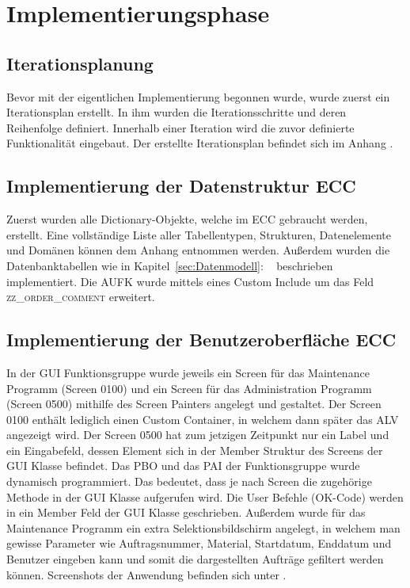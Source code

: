 \section{Implementierungsphase} 
\label{sec:Implementierungsphase}

\subsection{Iterationsplanung}
\label{sec:Iterationsplanung}
Bevor mit der eigentlichen Implementierung begonnen wurde, wurde zuerst ein Iterationsplan erstellt. In ihm wurden die Iterationsschritte und deren Reihenfolge definiert. Innerhalb einer Iteration wird die zuvor definierte Funktionalität eingebaut. Der erstellte Iterationsplan befindet sich im Anhang .

\subsection{Implementierung der Datenstruktur ECC}
\label{sec:Implementierung der Datenstruktur ECC}
Zuerst wurden alle Dictionary-Objekte, welche im \ac{ECC} gebraucht werden, erstellt. Eine vollständige Liste aller Tabellentypen, Strukturen, Datenelemente und Domänen können dem Anhang entnommen werden. Außerdem wurden die Datenbanktabellen wie in Kapitel~\ref{sec:Datenmodell}: ~ beschrieben implementiert. Die AUFK wurde mittels eines Custom Include um das Feld \textsc{zz\_order\_comment} erweitert.

\subsection{Implementierung der Benutzeroberfläche ECC}
\label{sec:Implementierung der Benutzeroberfläche ECC}
In der \ac{GUI} Funktionsgruppe wurde jeweils ein Screen für das Maintenance Programm (Screen 0100) und ein Screen für das Administration Programm (Screen 0500) mithilfe des Screen Painters angelegt und gestaltet. Der Screen 0100 enthält lediglich einen Custom Container, in welchem dann später das \ac{ALV} angezeigt wird. Der Screen 0500 hat zum jetzigen Zeitpunkt nur ein Label und ein Eingabefeld, dessen Element sich in der Member Struktur des Screens der \ac{GUI} Klasse befindet. Das \ac{PBO} und das \ac{PAI} der Funktionsgruppe wurde dynamisch programmiert. Das bedeutet, dass je nach Screen die zugehörige Methode in der \ac{GUI} Klasse aufgerufen wird. Die User Befehle (OK-Code) werden in ein Member Feld der \ac{GUI} Klasse geschrieben. Außerdem wurde für das Maintenance Programm ein extra Selektionsbildschirm angelegt, in welchem man gewisse Parameter wie Auftragsnummer, Material, Startdatum, Enddatum und Benutzer eingeben kann und somit die dargestellten Aufträge gefiltert werden können. Screenshots der Anwendung befinden sich unter .

